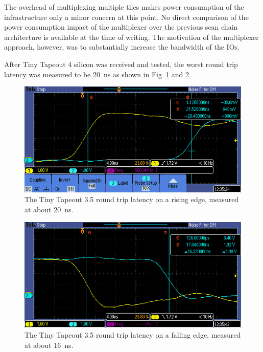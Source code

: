 The overhead of multiplexing multiple tiles makes power consumption of the infrastructure only a minor concern at this point. No direct comparison of the power consumption impact of the multiplexer over the previous scan chain architecture is available at the time of writing. The motivation of the multiplexer approach, however, was to substantially increase the bandwidth of the IOs.

After Tiny Tapeout 4 silicon was received and tested, the worst round trip latency was measured to be \qty{20}{\ns} as shown in Fig~\ref{fig:round_trip_latency_rising_edge} and \ref{fig:round_trip_latency_falling_edge}.

\begin{figure}[!t]
\centering
\includegraphics[width=\columnwidth]{./Figs/tt3p5 rising latency.PNG}
\caption{The Tiny Tapeout 3.5 round trip latency on a rising edge, measured at about \qty{20}{\ns}.}
\label{fig:round_trip_latency_rising_edge}
\end{figure}

\begin{figure}[!t]
\centering
\includegraphics[width=\columnwidth]{./Figs/tt3p5 falling latency.PNG}
\caption{The Tiny Tapeout 3.5 round trip latency on a falling edge, measured at about \qty{16}{\ns}.}
\label{fig:round_trip_latency_falling_edge}
\end{figure}

